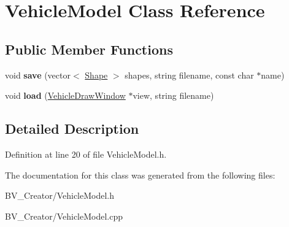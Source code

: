 \hypertarget{class_vehicle_model}{
\section{VehicleModel Class Reference}
\label{class_vehicle_model}
}
\subsection*{Public Member Functions}
\begin{DoxyCompactItemize}
\item 
\hypertarget{class_vehicle_model_ab49b0b47538cff81d3c799c63cf5e975}{
void {\bfseries save} (vector$<$ \hyperlink{class_shape}{Shape} $>$ shapes, string filename, const char $\ast$name)}
\label{class_vehicle_model_ab49b0b47538cff81d3c799c63cf5e975}

\item 
\hypertarget{class_vehicle_model_ace8af483d51893c15b4f302578e2667e}{
void {\bfseries load} (\hyperlink{class_vehicle_draw_window}{VehicleDrawWindow} $\ast$view, string filename)}
\label{class_vehicle_model_ace8af483d51893c15b4f302578e2667e}

\end{DoxyCompactItemize}


\subsection{Detailed Description}


Definition at line 20 of file VehicleModel.h.

The documentation for this class was generated from the following files:\begin{DoxyCompactItemize}
\item 
BV\_\-Creator/VehicleModel.h\item 
BV\_\-Creator/VehicleModel.cpp\end{DoxyCompactItemize}
